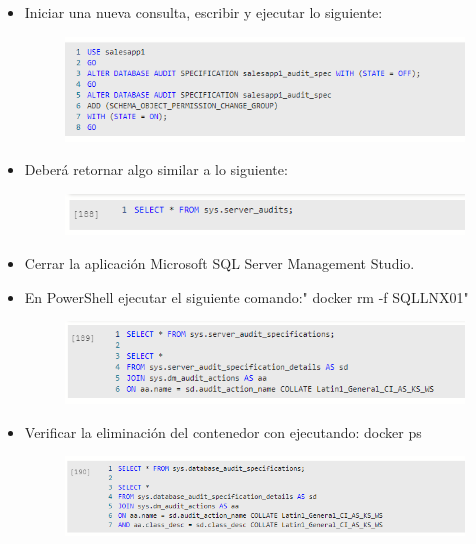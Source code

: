 \begin{itemize}
\begin{figure}[H]
\begin{center}
		\end{center}
		\end{figure}   
	\item Iniciar una nueva consulta, escribir y ejecutar lo siguiente:
                     \begin{figure}[H]
		\begin{center}
		\includegraphics[width=15cm]{./Imagenes/s15}
		\end{center}
		\end{figure}   
          \item Deberá retornar algo similar a lo siguiente:
                     \begin{figure}[H]
		\begin{center}
		\includegraphics[width=15cm]{./Imagenes/s16}
		\end{center}
		\end{figure}   
	\item Cerrar la aplicación Microsoft SQL Server Management Studio.
	\item En PowerShell ejecutar el siguiente comando:" docker rm -f SQLLNX01"
                     \begin{figure}[H]
		\begin{center}
		\includegraphics[width=15cm]{./Imagenes/s17}
		\end{center}
		\end{figure}   
	\item Verificar la eliminación del contenedor con ejecutando: docker ps
                    \begin{figure}[H]
		\begin{center}
		\includegraphics[width=15cm]{./Imagenes/s18}
		\end{center}
		\end{figure}   

\end{itemize}

